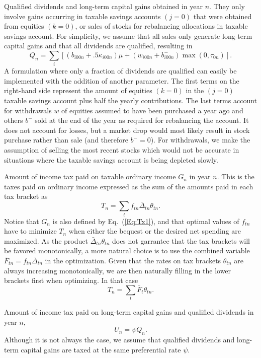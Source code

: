 \documentclass{article}[fleqn,12pt]
\begin{document}
\begin{description}[leftmargin=4em,style=multiline]
\item [$Q_n$]
	Qualified dividends and long-term capital gains obtained in year $n$.
	They only involve gains occurring in taxable savings accounts $(j=0)$ that
	were obtained from equities $(k=0)$, or sales of stocks for rebalancing allocations
	in taxable savings account.
	For simplicity, we assume that all sales only generate long-term capital gains and
	that all dividends are qualified, resulting in
	\begin{equation}
		\label{Eq:Qx2}
		Q_n = \sum_{i} \left[(b_{i00n} + .5\kappa_{i00n})\mu +
		(w_{i00n} + b^-_{i00n}){\max(0, \tau_{0n})}\right].
	\end{equation}
	A formulation where only a fraction of dividends are qualified can easily be
	implemented with the addition of another parameter.
	The first terms on the right-hand side represent the amount of equities $(k=0)$ in the $(j=0)$
	taxable savings account plus
	half the yearly contributions. The last terms account for withdrawals $w$ of equities assumed
	to have been purchased a year ago and others $b^-$ sold at the end
	of the year as required for rebalancing the account. It does not account for losses, but a market drop
	would most likely result in stock purchase rather than sale (and therefore $b^- = 0$).
	For withdrawals, we make the assumption of
	selling the most recent stocks which would not be accurate in situations where
	the taxable savings account is being depleted slowly.
\item [$T_n$]
	Amount of income tax paid on taxable ordinary income $G_n$ in year $n$.
	This is the taxes paid on ordinary income expressed as the sum of the amounts
	paid in each tax bracket as
	\begin{equation}
		\label{Eq:Tax}
		T_n = \sum_t f_{tn}\bar{\Delta}_{tn}\theta_{tn}.
	\end{equation}
	Notice that $G_n$ is also defined by Eq.~(\ref{Eq:Tx1}), and that optimal
	values of $f_{tn}$ have to
	minimize $T_n$ when either the bequest or the desired net spending are maximized.
	As the product $\bar{\Delta}_{tn}\theta_{tn}$ does not garrantee that the tax brackets
	will be favored monotonically, a more natural choice is to use the combined variable
	$\bar{F}_{tn} = f_{tn}\bar{\Delta}_{tn}$ in the optimization. Given that the rates on
	tax brackets $\theta_{tn}$ are always increasing monotonically, we are then naturally
	filling in the lower brackets first when optimizing. In that case
		\begin{equation}
			T_n = \sum_t \bar{F}_t \theta_{tn}.
		\end{equation}
\item [$U_n$]
	Amount of income tax paid on long-term capital gains and qualified dividends in year $n$,
	\begin{equation}
		U_n = \psi Q_n.
	\end{equation}
	Although it is not always the case, we assume that qualified dividends and long-term
	capital gains are taxed at the same preferential rate $\psi$.
\end{description}
\end{document}
